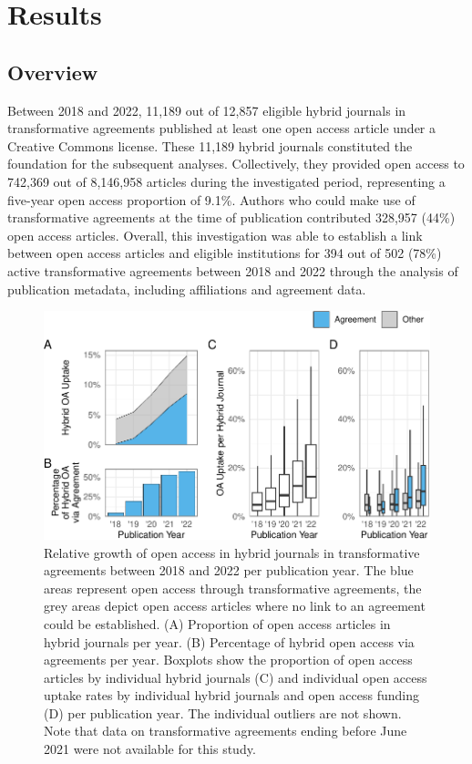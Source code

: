 \documentclass[a4paper,man,floatsintext,longtable,noextraspace,12pt]{apa6}
\begin{document}
\section{Results}\label{results}

\subsection{Overview}\label{overview}

Between 2018 and 2022, 11,189 out of 12,857 eligible hybrid journals in
transformative agreements published at least one open access article
under a Creative Commons license. These 11,189 hybrid journals
constituted the foundation for the subsequent analyses. Collectively,
they provided open access to 742,369 out of 8,146,958 articles during
the investigated period, representing a five-year open access proportion
of 9.1\%. Authors who could make use of transformative agreements at the
time of publication contributed 328,957 (44\%) open access articles.
Overall, this investigation was able to establish a link between open
access articles and eligible institutions for 394 out of 502 (78\%)
active transformative agreements between 2018 and 2022 through the
analysis of publication metadata, including affiliations and agreement
data.

\begin{figure}[ht!]

{\centering \includegraphics[width=0.99\linewidth,]{fig/results_overview-1} 

}

\caption{Relative growth of open access in hybrid journals in transformative agreements between 2018 and 2022 per publication year. The blue areas represent open access through transformative agreements, the grey areas depict open access articles where no link to an agreement could be established. (A) Proportion of open access articles in hybrid journals per year. (B) Percentage of hybrid open access via agreements per year. Boxplots show the proportion of open access articles by individual hybrid journals (C) and individual open access uptake rates by individual hybrid journals and open access funding (D) per publication year. The individual outliers are not shown. Note that data on transformative agreements ending before June 2021 were not available for this study.}\label{fig:results_overview}
\end{figure}
\end{document}
